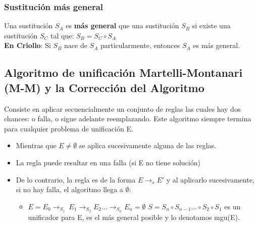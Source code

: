 \documentclass[10pt,a4paper]{article}
\begin{document}
\subsubsection*{Sustitución más general}
Una sustitución \textbf{$S_{A}$} es \textbf{más general} que una sustitución \textbf{$S_{B}$} si existe una sustitución \textbf{$S_{C}$} tal que: $S_{B} = S_{C} \circ S_{A} $ \\
\textbf{En Criollo}: Si $S_{B}$ nace de $S_{A}$ particularmente, entonces $S_{A}$ es más general.
\subsection*{Algoritmo de unificación Martelli-Montanari (M-M) y la Corrección del Algoritmo}
Consiste en aplicar secuencialmente un conjunto de reglas las cuales hay dos chances: o falla, o sigue adelante reemplazando. Este algoritmo siempre termina para cualquier problema de unificación E.
\begin{itemize}
    \item Mientras que $E \neq \emptyset$ se aplica sucesivamente alguna de las reglas.
    \item La regla puede resultar en una falla (si E no tiene solución)
    \item De lo contrario, la regla es de la forma $E \rightarrow_{s} E'$ y al aplicarlo sucesivamente, si no hay falla, el algoritmo llega a $\emptyset$: 
    \begin{itemize}
        \item $E = E_{0} \rightarrow_{S_{1}} \ E_{1} \rightarrow_{S_{2}} E_{2} \dots \rightarrow_{S_{n}} E_{n} = \emptyset$
        $S = S_{n} \circ S_{n-1} \dots \circ S_{2} \circ S_{1}$ es un unificador para E, es el más general posible y lo denotamos mgu(E).
    \end{itemize}
\end{itemize}
\end{document}
